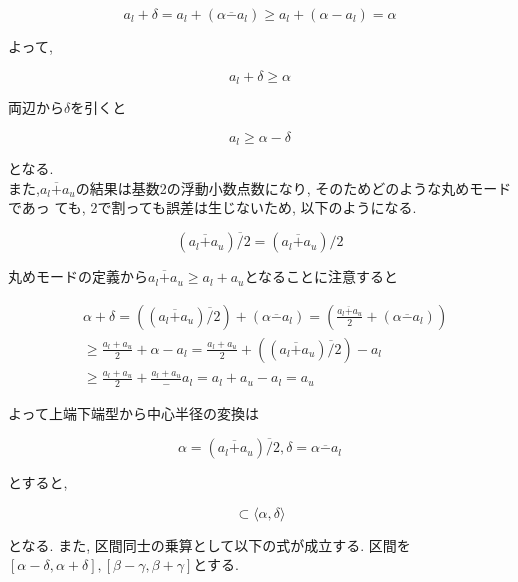 \documentclass[11pt,a4paper]{jsreport}
\theoremstyle{definition}
\begin{document}
  \begin{equation*}
    a_l + \delta = a_l + (\alpha \overline{-} a_l) \geq a_l + (\alpha - a_l) = \alpha
  \end{equation*}

よって,

\begin{equation*}
  a_l + \delta \geq \alpha
\end{equation*}

両辺から$\delta$を引くと

\begin{equation*}
  a_l \geq \alpha - \delta
\end{equation*}

となる. \\
  また,$a_l \overline{+} a_u$の結果は基数2の浮動小数点数になり, そのためどのような丸めモードであっ
ても, 2で割っても誤差は生じないため, 以下のようになる.

\begin{equation*}
  (a_l \overline{+} a_u) \overline{/} 2 = (a_l \overline{+} a_u)/2
\end{equation*}

丸めモードの定義から$a_l \overline{+} a_u \geq a_l + a_u$となることに注意すると

\begin{align*}
&  \alpha + \delta = ((a_l \overline{+} a_u) \overline{/}2) + (\alpha \overline{-} a_l) = \left(\frac{a_l \overline{+} a_u}{2}+(\alpha \overline{-} a_l)\right) \\
&  \geq \frac{a_l + a_u}{2} + \alpha - a_l = \frac{a_l + a_u}{2} + ((a_l \overline{+} a_u) \overline{/} 2) - a_l \\
&  \geq \frac{a_l + a_u}{2} + \frac{a_l + a_u} - a_l = a_l + a_u - a_l = a_u
\end{align*}

よって上端下端型から中心半径の変換は

\begin{equation*}
  \alpha = (a_l \overline{+} a_u) \overline{/} 2,\delta = \alpha \overline{-} a_l
\end{equation*}

とすると,

\begin{equation*}
  [a_l,a_u] \subset \langle \alpha,\delta \rangle
\end{equation*}

となる.
  また, 区間同士の乗算として以下の式が成立する. 区間を$[\alpha - \delta,\alpha + \delta],[\beta - \gamma,\beta + \gamma]$とする.
\end{document}
